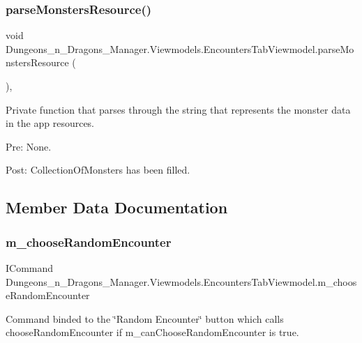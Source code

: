 \subsubsection{\texorpdfstring{parse\+Monsters\+Resource()}{parseMonstersResource()}}
{\footnotesize\ttfamily void Dungeons\+\_\+n\+\_\+\+Dragons\+\_\+\+Manager.\+Viewmodels.\+Encounters\+Tab\+Viewmodel.\+parse\+Monsters\+Resource (\begin{DoxyParamCaption}{ }\end{DoxyParamCaption})\hspace{0.3cm}{\ttfamily [inline]}, {\ttfamily [private]}}



Private function that parses through the string that represents the monster data in the app resources. 

Pre\+: None.

Post\+: Collection\+Of\+Monsters has been filled. 

\subsection{Member Data Documentation}
\mbox{\label{class_dungeons__n___dragons___manager_1_1_viewmodels_1_1_encounters_tab_viewmodel_a67d74993af6d6c95004186a149c0b32c}} 
\subsubsection{\texorpdfstring{m\+\_\+choose\+Random\+Encounter}{m\_chooseRandomEncounter}}
{\footnotesize\ttfamily I\+Command Dungeons\+\_\+n\+\_\+\+Dragons\+\_\+\+Manager.\+Viewmodels.\+Encounters\+Tab\+Viewmodel.\+m\+\_\+choose\+Random\+Encounter\hspace{0.3cm}{\ttfamily [private]}}



Command binded to the \char`\"{}\+Random Encounter\char`\"{} button which calls choose\+Random\+Encounter if m\+\_\+can\+Choose\+Random\+Encounter is true. 

